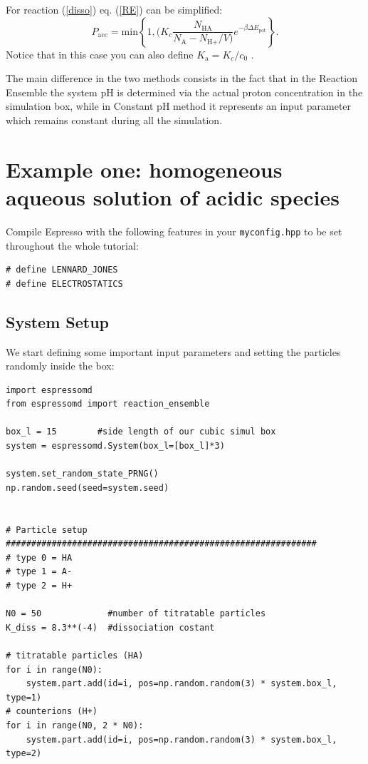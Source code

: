 \documentclass[
a4paper,                        %
11pt,                           %
twoside,                        %
footsepline,                    %
headsepline,                    %
headexclude,                    %
footexclude,                    %
pagesize,                       %
]{scrartcl}
\begin{document}
\noindent For reaction (\ref{disso}) eq. (\ref{RE}) can be simplified: 
\begin{equation}
P_{\text{acc}} = \text{min} \left\lbrace 1, (  K_c \frac{N_{\text{HA}}}{N_\text{A} - N_{\text{H}+}/V)} e^{-\beta \Delta E_\text{pot}}  \right\rbrace\text{.}
\end{equation}
Notice that in this case you can also define $K_\text{a} = K_c/c_0$ .

The main difference in the two methods consists in the fact that in the Reaction Ensemble the system pH is determined via the actual proton concentration in the simulation box, while in Constant pH method it represents an input parameter which remains constant during all the simulation.


\section{Example one: homogeneous aqueous solution of acidic species}

Compile Espresso with the following features in your
\texttt{myconfig.hpp} to be set throughout the whole tutorial:

\begin{verbatim}
# define LENNARD_JONES
# define ELECTROSTATICS
\end{verbatim}

\subsection{System Setup}

We start defining some important input parameters and setting the particles randomly inside the box:
\begin{verbatim}
import espressomd
from espressomd import reaction_ensemble

box_l = 15        #side length of our cubic simul box
system = espressomd.System(box_l=[box_l]*3)

system.set_random_state_PRNG()
np.random.seed(seed=system.seed)


# Particle setup
#############################################################
# type 0 = HA
# type 1 = A-
# type 2 = H+

N0 = 50             #number of titratable particles
K_diss = 8.3**(-4)  #dissociation costant 
 
# titratable particles (HA)
for i in range(N0):
    system.part.add(id=i, pos=np.random.random(3) * system.box_l, type=1)
# counterions (H+)   
for i in range(N0, 2 * N0):
    system.part.add(id=i, pos=np.random.random(3) * system.box_l, type=2)
\end{verbatim}
\end{document}
